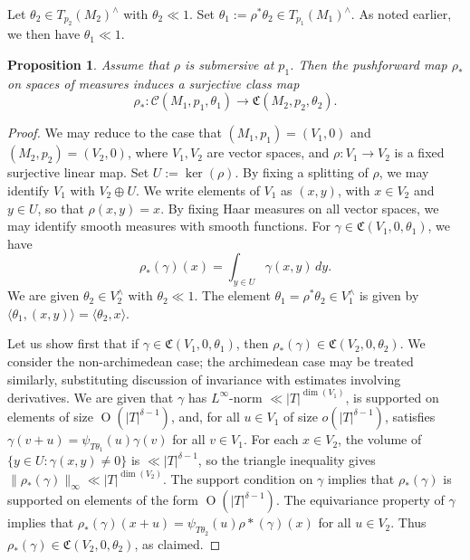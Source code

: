 \documentclass[reqno]{amsart}
\def\O{\operatorname{O}}
\theoremstyle{plain} \newtheorem{theorem} {Theorem}
\newtheorem{proposition} [theorem] {Proposition}
\theoremstyle{definition} \newtheorem{definition} [theorem] {Definition}
\theoremstyle{itplain} %
\numberwithin{equation}{section}
\numberwithin{theorem}{section}
\begin{document}
Let $\theta_2 \in T_{p_2}(M_2)^\wedge$ with $\theta_2 \ll 1$.  Set $\theta_1 := \rho^* \theta_2 \in T_{p_1}(M_1)^\wedge$.  As noted earlier, we then have $\theta_1 \ll 1$.

\begin{proposition}\label{lem:assume-that-rho}
  Assume that $\rho$ is submersive at $p_1$.  Then the pushforward map $\rho_*$ on spaces of measures induces a surjective class map
  \begin{equation}\label{eq:phi_-:-mathcalcm_1}
    \rho_* : \mathcal{C}(M_1,p_1,\theta_1) \rightarrow \mathfrak{C}(M_2,p_2,\theta_2).
  \end{equation}
\end{proposition}
\begin{proof}
  We may reduce to the case that $(M_1,p_1) = (V_1,0)$ and $(M_2,p_2) = (V_2,0)$, where $V_1, V_2$ are vector spaces, and $\rho : V_1 \rightarrow V_2$ is a fixed surjective linear map.  Set $U := \ker(\rho)$.  By fixing a splitting of $\rho$, we may identify $V_1$ with $V_2 \oplus U$.  We write elements of $V_1$ as $(x,y)$, with $x \in V_2$ and $y \in U$, so that $\rho(x,y) = x$.  By fixing Haar measures on all vector spaces, we may identify smooth measures with smooth functions.  For $\gamma \in \mathfrak{C}(V_1, 0, \theta_1)$, we have
  \begin{equation*}
    \rho_*(\gamma)(x) = \int _{y \in U}
    \gamma(x, y) \, d y.
  \end{equation*}
  We are given $\theta_2 \in V_2^\wedge$ with $\theta_2 \ll 1$.  The element $\theta_1 = \rho^* \theta_2 \in V_1^\wedge$ is given by $\langle \theta_1, (x,y) \rangle = \langle \theta_2, x \rangle$.

  Let us show first that if $\gamma \in \mathfrak{C}(V_1, 0, \theta_1)$, then $\rho_*(\gamma) \in \mathfrak{C}(V_2,0,\theta_2)$.  We consider the non-archimedean case; the archimedean case may be treated similarly, substituting discussion of invariance with estimates involving derivatives.  We are given that $\gamma$ has $L^\infty$-norm $\ll |T|^{\dim(V_1)}$, is supported on elements of size $\O(|T|^{\delta-1})$, and, for all $u \in V_1$ of size $o(|T|^{\delta-1})$, satisfies $\gamma(v + u) = \psi_{T \theta_1}(u) \gamma(v)$ for all $v \in V_1$.  For each $x \in V_2$, the volume of $\{y \in U : \gamma(x,y) \neq 0\}$ is $\ll |T|^{\delta-1}$, so the triangle inequality gives $\|\rho_*(\gamma)\|_{\infty} \ll |T|^{\dim(V_2)}$.  The support condition on $\gamma$ implies that $\rho_*(\gamma)$ is supported on elements of the form $\O(|T|^{\delta-1})$.  The equivariance property of $\gamma$ implies that $\rho_*(\gamma)(x + u) = \psi_{T \theta_2}(u) \rho*(\gamma)(x)$ for all $u \in V_2$.  Thus $\rho_*(\gamma) \in \mathfrak{C}(V_2,0,\theta_2)$, as claimed.


\end{proof}
\end{document}
